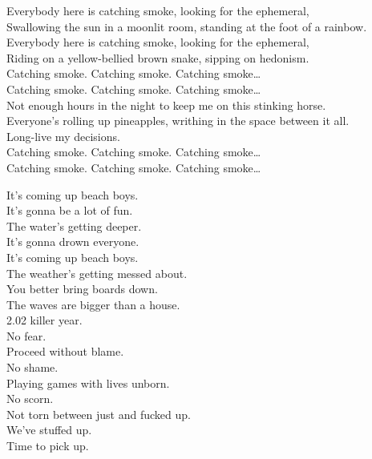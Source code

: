 Everybody here is catching smoke, looking for the ephemeral, \\
Swallowing the sun in a moonlit room, standing at the foot of a rainbow. \\
Everybody here is catching smoke, looking for the ephemeral, \\
Riding on a yellow-bellied brown snake, sipping on hedonism. \\

Catching smoke. Catching smoke. Catching smoke… \\
Catching smoke. Catching smoke. Catching smoke… \\

Not enough hours in the night to keep me on this stinking horse. \\
Everyone's rolling up pineapples, writhing in the space between it all. \\
Long-live my decisions. \\

Catching smoke. Catching smoke. Catching smoke… \\
Catching smoke. Catching smoke. Catching smoke… \\




It's coming up beach boys. \\
It's gonna be a lot of fun. \\
The water's getting deeper. \\
It's gonna drown everyone. \\
It's coming up beach boys. \\
The weather's getting messed about. \\
You better bring boards down. \\
The waves are bigger than a house. \\

2.02 killer year. \\
No fear. \\
Proceed without blame. \\
No shame. \\
Playing games with lives unborn. \\
No scorn. \\
Not torn between just and fucked up. \\
We've stuffed up. \\
Time to pick up. \\

